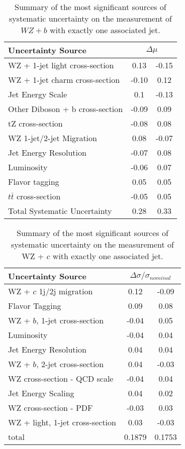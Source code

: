 \begin{table}[H]
    \centering
    \begin{tabular}{l|cc}
        \hline\hline
        Uncertainty Source & \multicolumn{2}{c}{$\Delta \mu$ }  \\
        \hline
        WZ + 1-jet light cross-section & 0.13 & -0.15 \\
        WZ + 1-jet charm cross-section & -0.10 & 0.12 \\
        Jet Energy Scale & 0.1 & -0.13 \\
        Other Diboson + b cross-section & -0.09 & 0.09 \\
        tZ cross-section & -0.08 & 0.08 \\
        WZ 1-jet/2-jet Migration & 0.08 & -0.07 \\
        Jet Energy Resolution & -0.07 & 0.08 \\
        Luminosity & -0.06 & 0.07 \\
        Flavor tagging & 0.05 & 0.05 \\
        $t\bar{t}$ cross-section & -0.05 & 0.05 \\
        \hline
        Total Systematic Uncertainty & 0.28 & 0.33 \\
        \hline\hline
    \end{tabular}
    \caption{Summary of the most significant sources of systematic uncertainty on the measurement of $WZ+b$ with exactly one associated jet.}
    \label{tab:systematics_1j}
\end{table}


\begin{table}[H]
  \centering
      \begin{tabular}{l|cc}
        \hline\hline
        Uncertainty Source & \multicolumn{2}{c}{$\Delta \sigma/\sigma_{nominal}$ }  \\
        \hline
        WZ + $c$ 1j/2j migration & 0.12 & -0.09 \\
        Flavor Tagging & 0.09 & 0.08 \\
        WZ + $b$, 1-jet cross-section & -0.04 & 0.05 \\
        Luminosity & -0.04 & 0.04 \\
        Jet Energy Resolution & 0.04 & 0.04 \\
        WZ + $b$, 2-jet cross-section & 0.04 & -0.03 \\
        WZ cross-section - QCD scale & -0.04 & 0.04 \\
        Jet Energy Scaling & 0.04 & 0.02 \\
        WZ cross-section - PDF & -0.03 & 0.03 \\
        WZ + light, 1-jet cross-section & 0.03 & -0.03 \\
        \hline
        total & 0.1879 & 0.1753 \\
        \hline\hline
    \end{tabular}
    \caption{Summary of the most significant sources of systematic uncertainty on the measurement of WZ + $c$ with exactly one associated jet.}
    \label{tab:systematics_c1j}
\end{table}

